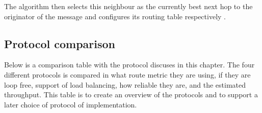 The algorithm then selects this neighbour as the currently best next hop to the originator of the message and configures its routing table respectively \cite{BATMAN}.

\subsection{Protocol comparison}
Below is a comparison table with the protocol discuses in this chapter.
The four different protocols is compared in what route metric they are using, if they are loop free, support of load balancing, how reliable they are, and the estimated throughput.
This table is to create an overview of the protocols and to support a later choice of protocol of implementation.

\begin{table}[!ht]
\caption{Protocol comparison}
\label{my-label}
\end{table}
